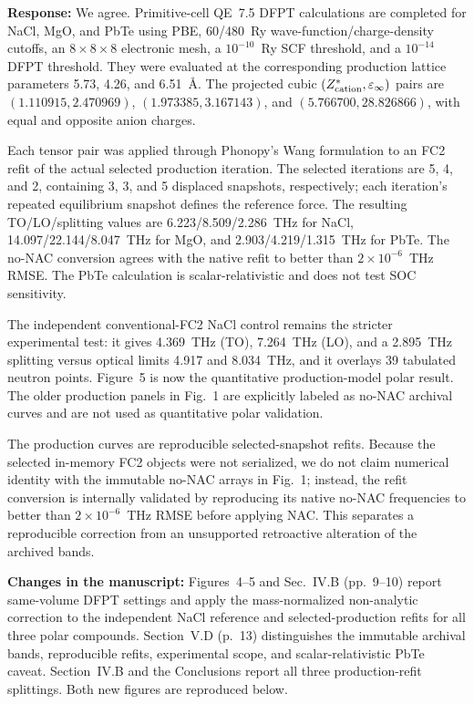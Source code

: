 \documentclass[11pt]{article}
\newcommand{\Answer}[1]{\par\noindent\color{black}\normalfont\textbf{Response:} #1\par\smallskip}
\newcommand{\Change}[1]{\par\noindent\color{revisionblue}\normalfont\textbf{Changes in the manuscript:} #1\par\color{black}\medskip}
\begin{document}
\Answer{We agree. Primitive-cell QE~7.5 DFPT calculations are completed for
NaCl, MgO, and PbTe using PBE, 60/480~Ry wave-function/charge-density cutoffs,
an $8\times8\times8$ electronic mesh, a $10^{-10}$~Ry SCF threshold, and a
$10^{-14}$ DFPT threshold. They were evaluated at the corresponding production
lattice parameters 5.73, 4.26, and 6.51~\AA. The projected cubic
$(Z^*_{\rm cation},\varepsilon_\infty)$ pairs are
$(1.110915,2.470969)$, $(1.973385,3.167143)$, and
$(5.766700,28.826866)$, with equal and opposite anion charges.

Each tensor pair was applied through Phonopy's Wang formulation to an FC2 refit
of the actual selected production iteration. The selected iterations are 5, 4,
and 2, containing 3, 3, and 5 displaced snapshots, respectively; each
iteration's repeated equilibrium snapshot defines the reference force. The
resulting TO/LO/splitting values are 6.223/8.509/2.286~THz for NaCl,
14.097/22.144/8.047~THz for MgO, and 2.903/4.219/1.315~THz for PbTe. The no-NAC
conversion agrees with the native refit to better than $2\times10^{-6}$~THz RMSE.
The PbTe calculation is scalar-relativistic and does not test SOC sensitivity.

The independent conventional-FC2 NaCl control remains the stricter experimental
test: it gives 4.369~THz (TO), 7.264~THz (LO), and a 2.895~THz splitting versus
optical limits 4.917 and 8.034~THz, and it overlays 39 tabulated neutron points.
Figure~5 is now the quantitative production-model polar result. The older
production panels in Fig.~1 are explicitly labeled as no-NAC archival curves
and are not used as quantitative polar validation.

The production curves are reproducible selected-snapshot refits. Because the
selected in-memory FC2 objects were not serialized, we do not claim numerical
identity with the immutable no-NAC arrays in Fig.~1; instead, the refit
conversion is internally validated by reproducing its native no-NAC frequencies
to better than $2\times10^{-6}$~THz RMSE before applying NAC. This separates a
reproducible correction from an unsupported retroactive alteration of the
archived bands.}

\Change{Figures~4--5 and Sec.~IV.B (pp.~9--10) report same-volume DFPT
settings and apply the mass-normalized non-analytic correction to the
independent NaCl reference and selected-production refits for all three polar
compounds. Section~V.D (p.~13) distinguishes the immutable archival bands,
reproducible refits, experimental scope, and scalar-relativistic PbTe caveat.
Section~IV.B and the Conclusions report all three production-refit splittings.
Both new figures are reproduced below.}
\end{document}
